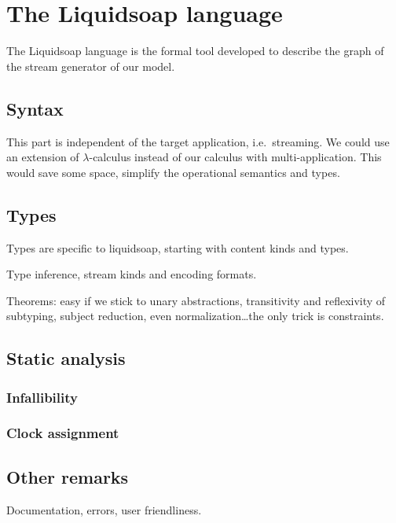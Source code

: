 \documentclass{llncs}
\newcommand{\liquidsoap}{Liquidsoap}
\newcommand{\ie}{{i.e.}}
\begin{document}
\section{The \liquidsoap{} language}
\label{sec:lang}

The \liquidsoap{} language is the formal tool developed to describe the graph of the
stream generator of our model.

\subsection{Syntax}

This part is independent of the target application, \ie\ streaming.
We could use an extension of $\lambda$-calculus instead of our calculus with
multi-application. This would save some space, simplify the operational 
semantics and types.

\subsection{Types}

Types are specific to liquidsoap, starting with content kinds and types.

Type inference, stream kinds and encoding formats.

Theorems: easy if we stick to unary abstractions,
transitivity and reflexivity of subtyping, subject reduction,
even normalization\ldots the only trick is constraints.

\subsection{Static analysis}

\subsubsection{Infallibility}
\subsubsection{Clock assignment}

\subsection{Other remarks}

Documentation, errors, user friendliness.



\end{document}
